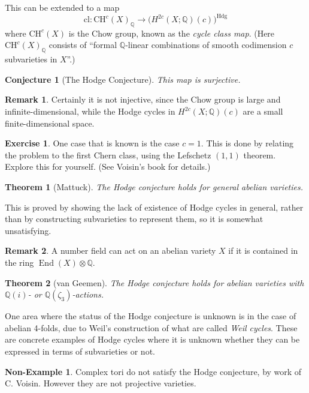 \documentclass{article}
\newtheorem*{conjecture}{Conjecture}
\newtheorem*{theorem}{Theorem}
\theoremstyle{definition}
\newtheorem*{nonexample}{Non-Example}
\newtheorem*{remark}{Remark}
\newtheorem*{exercise}{Exercise}
\DeclareMathOperator{\End}{End}
\newcommand{\cl}{\mathrm{cl}}
\newcommand{\CH}{\mathrm{CH}}
\newcommand{\Hdg}{\mathrm{Hdg}}
\newcommand{\Q}{\mathbb{Q}}
\begin{document}
This can be extended to a map
\begin{equation*}
    \cl:\CH^c(X)_\Q \to \bigl(H^{2c}(X;\Q)(c)\bigr)^\Hdg
\end{equation*}
where $\CH^c(X)$ is the Chow group, known as the \emph{cycle class map}. (Here
$\CH^c(X)_\Q$ consists of ``formal $\Q$-linear combinations of smooth
codimension $c$ subvarieties in $X$''.)

\begin{conjecture}[The Hodge Conjecture]
    This map is surjective.
\end{conjecture}

\begin{remark}
    Certainly it is not injective, since the Chow group is large and
    infinite-dimensional, while the Hodge cycles in $H^{2c}(X;\Q)(c)$ are a
    small finite-dimensional space.
\end{remark}

\begin{exercise}
    One case that is known is the case $c=1$. This is done by relating the
    problem to the first Chern class, using the Lefschetz $(1,1)$ theorem.
    Explore this for yourself. (See Voisin's book for details.)
\end{exercise}

\begin{theorem}[Mattuck]
    The Hodge conjecture holds for general abelian varieties.
\end{theorem}
This is proved by showing the lack of existence of Hodge cycles in general,
rather than by constructing subvarieties to represent them, so it is somewhat
unsatisfying.

\begin{remark}
    A number field can act on an abelian variety $X$ if it is contained in the
    ring $\End(X)\otimes\Q$.
\end{remark}

\begin{theorem}[van Geemen]
    The Hodge conjecture holds for abelian varieties with $\Q(i)$- or
    $\Q(\zeta_3)$-actions.
\end{theorem}

One area where the status of the Hodge conjecture is unknown is in the case of
abelian 4-folds, due to Weil's construction of what are called \emph{Weil
cycles}. These are concrete examples of Hodge cycles where it is unknown whether
they can be expressed in terms of subvarieties or not.

\begin{nonexample}
    Complex tori do not satisfy the Hodge conjecture, by work of C. Voisin.
    However they are not projective varieties.
\end{nonexample}
\end{document}
